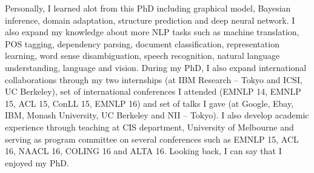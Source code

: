 \documentclass[12pt,twoside,final,hidelinks]{ltthesis}
\theoremstyle{definition}
\begin{document}
Personally, I learned alot from this PhD including graphical model, Bayesian inference, domain adaptation, structure prediction and deep neural network. I also expand my knowledge about more NLP tasks such as machine translation, POS tagging, dependency parsing, document classification, representation learning, word sense disambiguation, speech recognition, natural language understanding, language and vision. During my PhD, I also expand international collaborations through my two internships (at IBM Research -- Tokyo and ICSI, UC Berkeley), set of international conferences I attended (EMNLP 14, EMNLP 15, ACL 15, ConLL 15, EMNLP 16) and set of talks I gave (at Google, Ebay, IBM, Monash University, UC Berkeley and NII -- Tokyo). I also develop academic experience through teaching at CIS department, University of Melbourne and serving as program committee on several conferences such as EMNLP 15, ACL 16, NAACL 16, COLING 16 and ALTA 16. Looking back, I can say that I enjoyed my PhD. 

% 




%


%


%



%


\footnotesize

\normalsize
%

\end{document}
